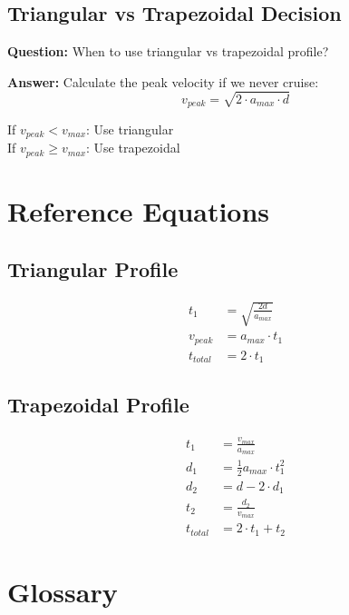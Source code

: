 \documentclass[12pt,a4paper]{article}
\begin{document}
\subsection{Triangular vs Trapezoidal Decision}

\textbf{Question:} When to use triangular vs trapezoidal profile?

\textbf{Answer:} Calculate the peak velocity if we never cruise:
\begin{equation}
    v_{peak} = \sqrt{2 \cdot a_{max} \cdot d}
\end{equation}

If $v_{peak} < v_{max}$: Use triangular\\
If $v_{peak} \geq v_{max}$: Use trapezoidal

\section{Reference Equations}

\subsection{Triangular Profile}
\begin{align}
    t_1 &= \sqrt{\frac{2d}{a_{max}}} \\
    v_{peak} &= a_{max} \cdot t_1 \\
    t_{total} &= 2 \cdot t_1
\end{align}

\subsection{Trapezoidal Profile}
\begin{align}
    t_1 &= \frac{v_{max}}{a_{max}} \\
    d_1 &= \frac{1}{2} a_{max} \cdot t_1^2 \\
    d_2 &= d - 2 \cdot d_1 \\
    t_2 &= \frac{d_2}{v_{max}} \\
    t_{total} &= 2 \cdot t_1 + t_2
\end{align}

\section{Glossary}
\end{document}
